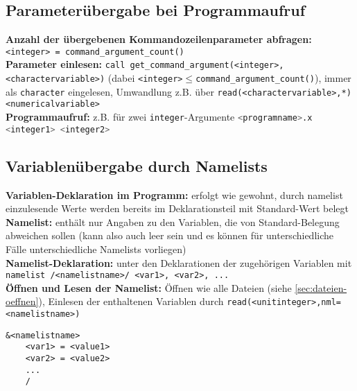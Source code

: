 \documentclass[a4paper, twocolumn]{scrarticle}
\begin{document}
\subsection{Parameterübergabe bei Programmaufruf}
\textbf{Anzahl der übergebenen Kommandozeilenparameter abfragen:} \lstinline|<integer> = command_argument_count()|\\
\textbf{Parameter einlesen:} \lstinline|call get_command_argument(<integer>, <charactervariable>)| (dabei \lstinline|<integer>|$\leq$\lstinline|command_argument_count()|), immer als \lstinline|character| eingelesen, Umwandlung z.B. über \lstinline|read(<charactervariable>,*) <numericalvariable>|\\
\textbf{Programmaufruf:} z.B. für zwei \lstinline|integer|-Argumente \lstinline[language=bash]|<programname>.x <integer1> <integer2>|

\subsection{Variablenübergabe durch Namelists}
\textbf{Variablen-Deklaration im Programm:} erfolgt wie gewohnt, durch namelist einzulesende Werte werden bereits im Deklarationsteil mit Standard-Wert belegt\\
\textbf{Namelist:} enthält nur Angaben zu den Variablen, die von Standard-Belegung abweichen sollen (kann also auch leer sein und es können für unterschiedliche Fälle unterschiedliche Namelists vorliegen)\\
\textbf{Namelist-Deklaration:} unter den Deklarationen der zugehörigen Variablen mit \lstinline|namelist /<namelistname>/ <var1>, <var2>, ...|\\
\textbf{Öffnen und Lesen der Namelist:} Öffnen wie alle Dateien (siehe \cref{sec:dateien-oeffnen}), Einlesen der enthaltenen Variablen durch \lstinline|read(<unitinteger>,nml=<namelistname>)|
\begin{lstlisting}[caption={Struktur Namelist-Datei <namelistname>.nml}]
	&<namelistname>
	<var1> = <value1>
	<var2> = <value2>
	...
	/
\end{lstlisting}
\end{document}
